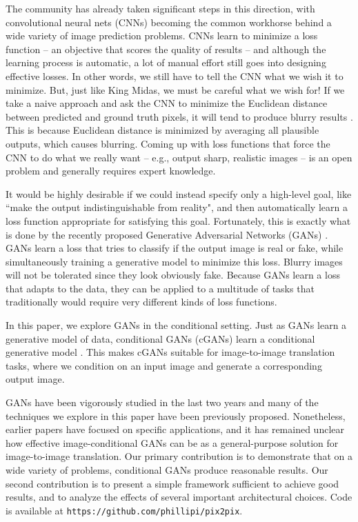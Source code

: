 The community has already taken significant steps in this direction, with convolutional neural nets (CNNs) becoming the common workhorse behind a wide variety of image prediction problems. CNNs learn to minimize a loss function -- an objective that scores the quality of results -- and although the learning process is automatic, a lot of manual effort still goes into designing effective losses. In other words, we still have to tell the CNN what we wish it to minimize. But, just like King Midas, we must be careful what we wish for! If we take a naive approach and ask the CNN to minimize the Euclidean distance between predicted and ground truth pixels, it will tend to produce blurry results \cite{pathak2016context, zhang2016colorful}. This is because Euclidean distance is minimized by averaging all plausible outputs, which causes blurring. Coming up with loss functions that force the CNN to do what we really want -- e.g., output sharp, realistic images -- is an open problem and generally requires expert knowledge.

It would be highly desirable if we could instead specify only a high-level goal, like ``make the output indistinguishable from reality", and then automatically learn a loss function appropriate for satisfying this goal. Fortunately, this is exactly what is done by the recently proposed Generative Adversarial Networks (GANs) \cite{goodfellow2014generative, denton2015deep, radford2015unsupervised, salimans2016improved, zhao2016energy}. GANs learn a loss that tries to classify if the output image is real or fake, while simultaneously training a generative model to minimize this loss. Blurry images will not be tolerated since they look obviously fake. Because GANs learn a loss that adapts to the data, they can be applied to a multitude of tasks that traditionally would require very different kinds of loss functions.

In this paper, we explore GANs in the conditional setting. Just as GANs learn a generative model of data, conditional GANs (cGANs) learn a conditional generative model \cite{goodfellow2014generative}. This makes cGANs suitable for image-to-image translation tasks, where we condition on an input image and generate a corresponding output image.

GANs have been vigorously studied in the last two years and many of the techniques we explore in this paper have been previously proposed. Nonetheless, earlier papers have focused on specific applications, and it has remained unclear how effective image-conditional GANs can be as a general-purpose solution for image-to-image translation. Our primary contribution is to demonstrate that on a wide variety of problems, conditional GANs produce reasonable results. Our second contribution is to present a simple framework sufficient to achieve good results, and to analyze the effects of several important architectural choices. Code is available at \texttt{https://github.com/phillipi/pix2pix}.

